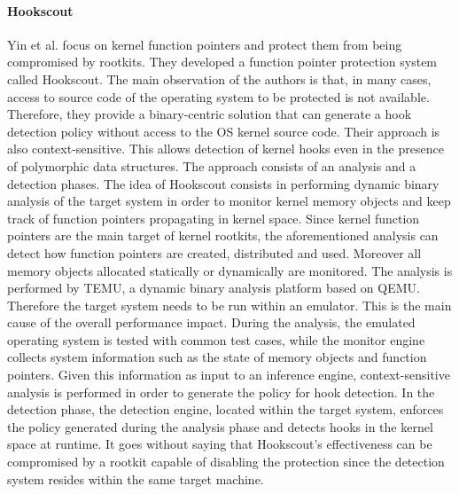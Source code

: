 \paragraph{Hookscout}
Yin et al. \cite{hookscout} focus on kernel function pointers and protect them from being compromised by rootkits. 
They developed a function pointer protection system called Hookscout. 
The main observation of the authors is that, in many cases, access to source code of the operating system to be protected is not available. Therefore, they provide a binary-centric solution that can generate a hook detection policy without access to the OS kernel source code. 
Their approach is also context-sensitive. This allows detection of kernel hooks even in the presence of polymorphic data structures.
The approach consists of an analysis and a detection phases.
The idea of Hookscout consists in performing dynamic binary analysis of the target system in order to monitor kernel memory objects and keep track of function pointers propagating in kernel space. Since kernel function pointers are the main target of kernel rootkits, the aforementioned analysis can detect how function pointers are created, distributed and used. Moreover all memory objects allocated statically or dynamically are monitored.
The analysis is performed by TEMU, a dynamic binary analysis platform based on QEMU. Therefore the target system needs to be run within an emulator. This is the main cause of the overall performance impact.
During the analysis, the emulated operating system is tested with common test cases, while the monitor engine collects system information such as the state of memory objects and function pointers. Given this information as input to an inference engine, context-sensitive analysis is performed in order to generate the policy for hook detection.
In the detection phase, the detection engine, located within the target system, enforces the policy generated
during the analysis phase and detects hooks in the kernel space at runtime.
It goes without saying that Hookscout's effectiveness can be compromised by a rootkit capable of disabling the protection since the detection system resides within the same target machine.


